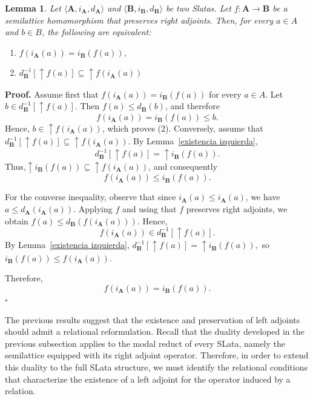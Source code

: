 \documentclass{article}
\newtheorem{lemma}{\bf Lemma}[section]
\newenvironment{proof}
{\par\noindent\textbf{Proof. }\rm}
{\hfill$\boldsymbol{\square}$\par\vspace{0.3cm}}
\begin{document}
\begin{lemma}\label{homo slata}
    Let $\langle \mathbf{A}, i_{\mathbf{A}}, d_{\mathbf{A}}\rangle$ and  $\langle \mathbf{B}, i_{\mathbf{B}}, d_{\mathbf{B}}\rangle$ be two Slatas. Let $f:\mathbf{A}\to \mathbf{B}$ be a semilattice homomorphism that preserves right adjoints. Then, for every $a\in A$ and $b\in B$, the following are equivalent: 
    \begin{enumerate}
        \item $f(i_\mathbf{A}(a))=i_{\mathbf{B}}(f(a)),$
        \item $d_\mathbf{B}^{-1}[\uparrow f(a)]\subseteq\uparrow f(i_\mathbf{A}(a))$
    \end{enumerate}
\end{lemma}
\begin{proof}
Assume first that
$f(i_\mathbf{A}(a))=i_\mathbf{B}(f(a))$
for every $a\in A$. Let
$b\in d_\mathbf{B}^{-1}[\uparrow f(a)]$.
Then
$f(a)\leq d_\mathbf{B}(b)$,
and therefore
$$
f(i_\mathbf{A}(a))
=
i_\mathbf{B}(f(a))
\leq b.
$$
Hence,
$b\in \uparrow f(i_\mathbf{A}(a))$,
which proves (2). Conversely, assume that
$d_\mathbf{B}^{-1}[\uparrow f(a)]
\subseteq
\uparrow f(i_\mathbf{A}(a))$.
By Lemma~\ref{existencia izquierda},
$$
d_\mathbf{B}^{-1}[\uparrow f(a)]
=
\uparrow i_\mathbf{B}(f(a)).
$$
Thus,$\uparrow i_\mathbf{B}(f(a))
\subseteq
\uparrow f(i_\mathbf{A}(a))$,
and consequently
$$
f(i_\mathbf{A}(a))
\leq
i_\mathbf{B}(f(a)).
$$

For the converse inequality, observe that since
$i_\mathbf{A}(a)\leq i_\mathbf{A}(a)$,
we have $a\leq d_\mathbf{A}(i_\mathbf{A}(a))$. Applying $f$ and using that $f$ preserves right adjoints, we obtain
$f(a)\leq d_\mathbf{B}(f(i_\mathbf{A}(a)))$.
Hence,
$$
f(i_\mathbf{A}(a))
\in
d_\mathbf{B}^{-1}[\uparrow f(a)].
$$
By Lemma~\ref{existencia izquierda}, $d_\mathbf{B}^{-1}[\uparrow f(a)]=\uparrow i_\mathbf{B}(f(a)),$
so $i_\mathbf{B}(f(a))\leq f(i_\mathbf{A}(a)).$

Therefore,
$$
f(i_\mathbf{A}(a))
=
i_\mathbf{B}(f(a)).
$$
\end{proof}

The previous results suggest that the existence and preservation of left adjoints should admit a relational reformulation. Recall that the duality developed in the previous subsection applies to the modal reduct of every SLata, namely the semilattice equipped with its right adjoint operator. Therefore, in order to extend this duality to the full SLata structure, we must identify the relational conditions that characterize the existence of a left adjoint for the operator induced by a relation.
\end{document}
